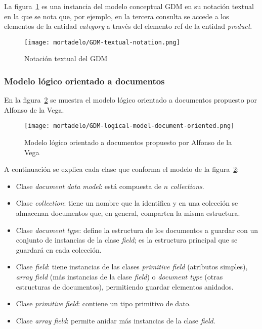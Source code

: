 La figura~\ref{img:mortadelo-gdm.textual.notation} es una instancia del modelo conceptual GDM en su notación textual en la que se nota que, por ejemplo, en la tercera consulta se accede a los elementos de la entidad \textit{category} a través del elemento ref de la entidad \textit{product}.


\begin{figure}[H] 
    \centering
    \texttt{[image: mortadelo/GDM-textual-notation.png]}
    \caption{Notación textual del GDM}
    \label{img:mortadelo-gdm.textual.notation}
\end{figure}

\subsubsection{Modelo lógico orientado a documentos}

En la figura~\ref{img:mortadelo-gdm-logical-model-document-oriented} se muestra el modelo lógico orientado a documentos propuesto por Alfonso de la Vega.


\begin{figure}[H] 
    \centering
    \texttt{[image: mortadelo/GDM-logical-model-document-oriented.png]}
    \caption{Modelo lógico orientado a documentos propuesto por Alfonso de la Vega}
    \label{img:mortadelo-gdm-logical-model-document-oriented}
\end{figure}

A continuación se explica cada clase que conforma el modelo de la figura~\ref{img:mortadelo-gdm-logical-model-document-oriented}:

\begin{itemize}
    \item Clase \textit{document data model}: está compuesta de $n$ \textit{collections}.
    \item Clase \textit{collection}: tiene un nombre que la identifica y en una colección se almacenan documentos que, en general, comparten la misma estructura.
    \item Clase \textit{document type}: define la estructura de los documentos a guardar con un conjunto de instancias de la clase \textit{field}; es la estructura principal que se guardará en cada colección.
    \item Clase \textit{field}: tiene instancias de las clases \textit{primitive field} (atributos simples), \textit{array field} (más instancias de la clase \textit{field}) o \textit{document type} (otras estructuras de documentos), permitiendo guardar elementos anidados.
    \item Clase \textit{primitive field}: contiene un tipo primitivo de dato.
    \item Clase \textit{array field}: permite anidar más instancias de la clase \textit{field}.
\end{itemize}


